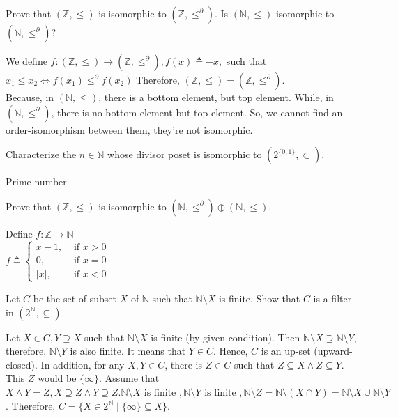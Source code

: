\documentclass[11pt,a4paper]{exam}
\newcommand{\Z}{\mathbb{Z}}
\newcommand{\N}{\mathbb{N}}
\newcommand{\dleq}{\leq^\partial}
\begin{document}
\begin{exo}
    Prove that $(\Z, \leq)$ is isomorphic to $(\Z, \leq^\partial)$. Is $(\N,\leq)$ isomorphic to $(\N, \leq^\partial)$?

    \begin{sol}
        We define $f \colon (\Z, \leq) \rightarrow (\Z, \dleq), f(x) \triangleq -x,$ such that $x_1 \leq x_2 \Leftrightarrow f(x_1) \dleq f(x_2)$
        Therefore, $(\Z, \leq) \overset{~}{=} (\Z, \dleq)$.\\
        Because, in $(\N, \leq)$, there is a bottom element, but top element. While, in $(\N, \dleq)$, there is no bottom element but top element.
        So, we cannot find an order-isomorphism between them, they're not isomorphic. 
    \end{sol}
\end{exo}

\begin{exo}
    Characterize the $n \in \N$ whose divisor poset is isomorphic to $(2^{\{0,1\}}, \subset)$.

    \begin{sol}
        Prime number
    \end{sol}
\end{exo}

\begin{exo}
    Prove that $(\Z,\leq)$ is isomorphic to $(\N, \leq^\partial) \oplus (\N,\leq)$.

    \begin{sol}
        Define $f \colon \Z \rightarrow \N$\\ 
        $f \triangleq   \begin{cases}
                            x-1,    &\text{ if } x > 0 \\
                            0,      &\text{ if } x = 0 \\ 
                            \vert x \vert, &\text{ if } x < 0
                        \end{cases}$ 
    \end{sol}
\end{exo}

\begin{exo}
    Let $C$ be the set of subset $X$ of $\N$ such that $\N \setminus X$ is finite. Show that $C$ is a filter in $(2^\N, \subseteq)$.

    \begin{sol}
        Let $X \in C, Y \supseteq X$ such that $\N \setminus X$ is finite (by given condition). Then $\N \setminus X \supseteq \N \setminus Y$, therefore, $\N \setminus Y$ is also finite. It means that $Y \in C$. Hence, $C$ is an up-set (upward-closed). In addition, for any $X, Y \in C$, there is $Z \in C$ such that $Z \subseteq X \land Z \subseteq Y$. This $Z$ would be $\{ \infty \}$. Assume that $X \land Y = Z, X \supseteq Z \land Y \supseteq Z. \N \setminus X \text{ is finite }, \N \setminus Y \text{ is finite }, \N \setminus Z = \N \setminus (X \cap Y) = \N \setminus X \cup \N \setminus Y$. Therefore, $C = \{X \in 2^{\N} \mid \{\infty\} \subseteq X \}$.        
    \end{sol}
\end{exo}
\end{document}
